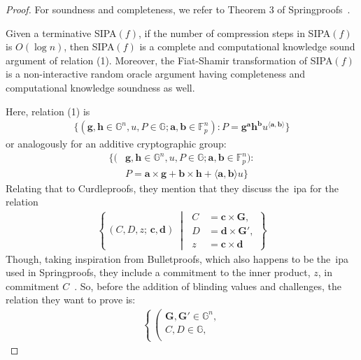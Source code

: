 \begin{proof}
    For soundness and completeness, we refer to Theorem 3 of Springproofs~\cite{zhang2024springproofs}.
    \begin{theorem}
        Given a terminative SIPA$(f)$, if the number of compression steps in SIPA$(f)$ is $O(\log n)$, then SIPA$(f)$ is a complete and computational knowledge sound argument of relation (1).
        Moreover, the Fiat-Shamir transformation of SIPA$(f)$ is a non-interactive random oracle argument having completeness and computational knowledge soundness as well.
    \end{theorem}
    Here, relation (1) is
    \begin{align}
        \{(\mathbf{g},\mathbf{h}\in\mathbb{G}^n,u,P\in\mathbb{G};\mathbf{a},\mathbf{b}\in\mathbb{F}_p^n):P=\mathbf{g}^\mathbf{a}\mathbf{h}^\mathbf{b}u^{\langle \mathbf{a},\mathbf{b}\rangle}\}
    \end{align}
    or analogously for an additive cryptographic group:
    \begin{align}
        \{(&\mathbf{g},\mathbf{h}\in\mathbb{G}^n,u,P\in\mathbb{G};\mathbf{a},\mathbf{b}\in\mathbb{F}_p^n):\\
        &P=\mathbf{a}\times\mathbf{g}+\mathbf{b}\times\mathbf{h}+\langle \mathbf{a},\mathbf{b}\rangle u\}\label{al:P}
    \end{align}
    Relating that to Curdleproofs, they mention that they discuss the~\gls{ipa} for the relation
    \begin{align}
        \left\{
        \,(C,D,z;\,\mathbf{c},\mathbf{d})\;\middle|\;
        \begin{aligned}
            C &= \mathbf{c} \times \mathbf{G},\\
            D &= \mathbf{d} \times \mathbf{G'},\\
            z &= \mathbf{c} \times \mathbf{d}
        \end{aligned}
        \right\}
    \end{align}
    Though, taking inspiration from Bulletproofs, which also happens to be the~\gls{ipa} used in Springproofs, they include a commitment to the inner product, $z$, in commitment $C$~\cite{bunz2018bulletproofs}.
    So, before the addition of blinding values and challenges, the relation they want to prove is:
    \begin{align}
        \left\{
        \, \left(
        \begin{aligned}
            \mathbf{G},\mathbf{G'}\in\mathbb{G}^n,\\
            C,D\in\mathbb{G},\\

\end{aligned}
\end{align}
\end{proof}
